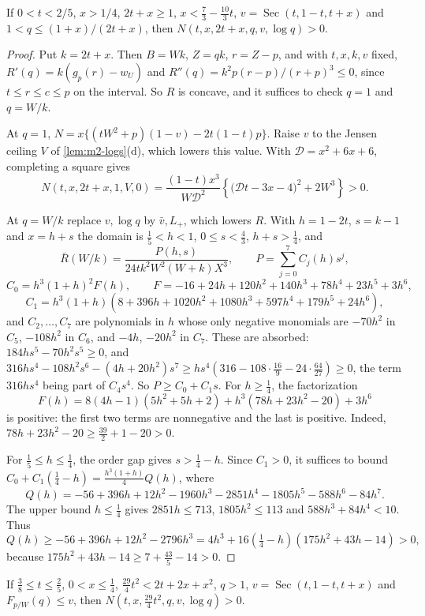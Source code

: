 \begin{lemma}\label{lem:m2-order-face}
If $0<t<2/5$, $x>1/4$, $2t+x\ge1$, $x<\frac73-\frac{10}3t$, $v=\operatorname{Sec}(t,1-t,t+x)$ and
$1<q\le(1+x)/(2t+x)$, then $N(t,x,2t+x,q,v,\log q)>0$.
\end{lemma}

\begin{proof}
Put $k=2t+x$. Then $B=Wk$, $Z=qk$, $r=Z-p$, and with $t,x,k,v$ fixed,
$R'(q)=k(g_p(r)-w_U)$ and $R''(q)=k^2p(r-p)/(r+p)^3\le0$, since $t\le r\le c\le p$ on the interval.
So $R$ is concave, and it suffices to check $q=1$ and $q=W/k$.

At $q=1$, $N=x\{(tW^2+p)(1-v)-2t(1-t)p\}$.
Raise $v$ to the Jensen ceiling $V$ of \cref{lem:m2-logs}(d), which lowers
this value. With $\mathcal D=x^2+6x+6$, completing a square gives
\[
 N(t,x,2t+x,1,V,0)
 =\frac{(1-t)x^3}{W\mathcal D^2}
   \left\{\bigl(\mathcal D t-3x-4\bigr)^2+2W^3\right\}>0.
\]

At $q=W/k$ replace $v,\log q$ by $\bar v,L_+$, which lowers $R$. With $h=1-2t$, $s=k-1$ and $x=h+s$
the domain is $\frac15<h<1$, $0\le s<\frac43$, $h+s>\frac14$, and
\[
\bar R(W/k)=\frac{P(h,s)}{24tk^2W^2(W+k)X^3},\qquad P=\sum_{j=0}^7C_j(h)s^j,
\]
\[
C_0=h^3(1+h)^2F(h),\qquad F=-16+24h+120h^2+140h^3+78h^4+23h^5+3h^6,
\]
\[
C_1=h^3(1+h)(8+396h+1020h^2+1080h^3+597h^4+179h^5+24h^6),
\]
and $C_2,\dots,C_7$ are polynomials in $h$ whose only negative monomials are $-70h^2$ in $C_5$,
$-108h^2$ in $C_6$, and $-4h$, $-20h^2$ in $C_7$. These are absorbed: $184hs^5-70h^2s^5\ge0$, and
$316hs^4-108h^2s^6-(4h+20h^2)s^7\ge hs^4(316-108\cdot\frac{16}9-24\cdot\frac{64}{27})\ge0$, the term
$316hs^4$ being part of $C_4s^4$. So $P\ge C_0+C_1s$. For $h\ge\frac14$, the factorization
\[
 F(h)=8(4h-1)(5h^2+5h+2)+h^3(78h+23h^2-20)+3h^6
\]
is positive: the first two terms are nonnegative and the last is positive. Indeed,
$78h+23h^2-20\ge\frac{39}{2}+1-20>0$.

For $\frac15\le h\le\frac14$, the order gap gives $s>\frac14-h$. Since $C_1>0$, it suffices to
bound $C_0+C_1(\frac14-h)=\frac{h^3(1+h)}4Q(h)$, where
\[
 Q(h)=-56+396h+12h^2-1960h^3-2851h^4-1805h^5-588h^6-84h^7.
\]
The upper bound $h\le\frac14$ gives
$2851h\le713$, $1805h^2\le113$ and $588h^3+84h^4<10$. Thus
\[
 Q(h)\ge-56+396h+12h^2-2796h^3
 =4h^3+16(\tfrac14-h)(175h^2+43h-14)>0,
\]
because $175h^2+43h-14\ge7+\frac{43}{5}-14>0$.
\end{proof}

\begin{lemma}\label{lem:m2-strip}
If $\frac38\le t\le\frac25$, $0<x\le\frac14$, $\frac{29}4t^2<2t+2x+x^2$, $q>1$,
$v=\operatorname{Sec}(t,1-t,t+x)$ and $F_{p/W}(q)\le v$, then $N(t,x,\frac{29}4t^2,q,v,\log q)>0$.
\end{lemma}

